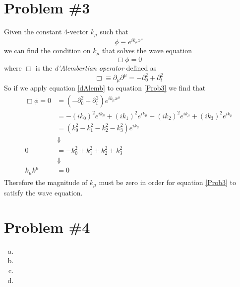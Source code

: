 \documentclass[11pt]{article}
\numberwithin{equation}{section}
\begin{document}
\section{Problem \#3}
    Given the constant 4-vector $k_{\mu}$ such that
    \begin{equation}
        \phi\equiv e^{ik_{\mu}x^{\mu}}
        \label{Prob3}
    \end{equation}
    we can find the condition on $k_{\mu}$ that solves the wave equation
    $$\Box\phi=0$$
    where $\Box$ is the \emph{d'Alembertian operator} defined as
    \begin{equation}
        \Box\equiv\partial_{\mu}\partial^{\mu} = -\partial_{0}^{2} + \partial_{i}^{2}
        \label{dAlemb}
    \end{equation}
    So if we apply equation \ref{dAlemb} to equation \ref{Prob3} we find that
    \begin{align*}
        \Box\phi = 0 &= (-\partial_{0}^{2} + \partial_{i}^{2})e^{ik_{\mu}x^{\mu}}\\
                     &= -(ik_0)^2e^{ik_{\mu}} + (ik_1)^2e^{ik_{\mu}}+ (ik_2)^2e^{ik_{\mu}}+ (ik_3)^2e^{ik_{\mu}}\\
                     &= (k_0^2 - k_1^2  - k_2^2 - k_3^2)e^{ik_{\mu}}\\
                     &\Downarrow\\
                   0 &= -k_0^2 + k_1^2  + k_2^2 + k_3^2 \\
                     &\Downarrow\\
        k_{\mu}k^{\mu} &= 0
    \end{align*}
    Therefore the magnitude of $k_{\mu}$ must be zero in order for equation \ref{Prob3} to satisfy the wave equation.

\pagebreak

\section{Problem \#4}
\begin{enumerate}[(a)]
\item
\item
\item
\item
\end{enumerate}
\end{document}
